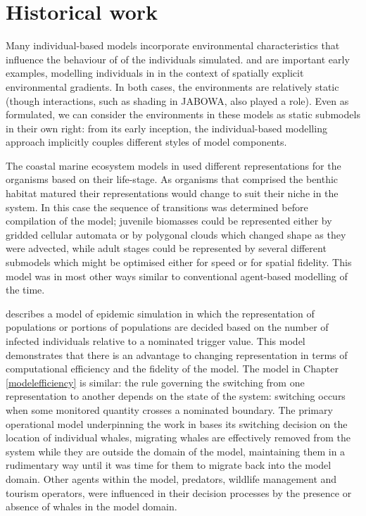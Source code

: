\section{Historical work}

Many individual-based models incorporate environmental characteristics
that influence the behaviour of of the individuals
simulated. \citet{Botkin72:2} and \citet{deangelis1978model} are
important early examples, modelling individuals in in the context of
spatially explicit environmental gradients. In both cases, the
environments are relatively static (though interactions, such as
shading in JABOWA, also played a role).  Even as formulated, we can
consider the environments in these models as static submodels in their
own right: from its early inception, the individual-based modelling
approach implicitly couples different styles of model components.

The coastal marine ecosystem models in \cite{Gray06:1} used different
representations for the organisms based on their life-stage. As
organisms that comprised the benthic habitat matured their
representations would change to suit their niche in the system.  In
this case the sequence of transitions was determined before
compilation of the model; juvenile biomasses could be represented
either by gridded cellular automata or by polygonal clouds which
changed shape as they were advected, while adult stages could be
represented by several different submodels which might be optimised
either for speed or for spatial fidelity.  This model was in most
other ways similar to conventional agent-based modelling of the time.


\cite{bobashev2007hybrid} describes a model of epidemic simulation in
which the representation of populations or portions of populations are
decided based on the number of infected individuals relative to a
nominated trigger value. This model demonstrates that there is an
advantage to changing representation in terms of computational
efficiency and the fidelity of the model. The model in Chapter
\ref{modelefficiency} is similar: the rule governing the switching
from one representation to another depends on the state of the system:
switching occurs when some monitored quantity crosses a nominated
boundary.  The primary operational model underpinning the work in
\cite{Gray2014,Fulton2009crossingscales} bases its switching decision on the
location of individual whales, migrating whales are effectively
removed from the system while they are outside the domain of the
model, maintaining them in a rudimentary way until it was time for
them to migrate back into the model domain. Other agents within the
model, predators, wildlife management and tourism operators, were
influenced in their decision processes by the presence or absence of
whales in the model domain.

